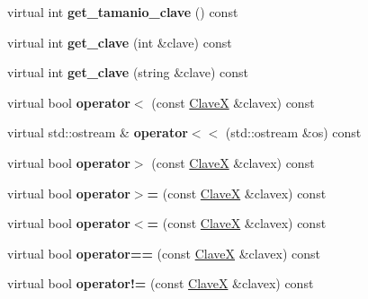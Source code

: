 \begin{DoxyCompactItemize}
\item 
\hypertarget{class_clave_x_a93b4ac4ef2ffc6097f29e64645c018c5}{virtual int {\bfseries get\-\_\-tamanio\-\_\-clave} () const }\label{class_clave_x_a93b4ac4ef2ffc6097f29e64645c018c5}

\item 
\hypertarget{class_clave_x_a253d37e0c4c94239fa0974912a369069}{virtual int {\bfseries get\-\_\-clave} (int \&clave) const }\label{class_clave_x_a253d37e0c4c94239fa0974912a369069}

\item 
\hypertarget{class_clave_x_a06133c17d00a6d21749a51374e06af24}{virtual int {\bfseries get\-\_\-clave} (string \&clave) const }\label{class_clave_x_a06133c17d00a6d21749a51374e06af24}

\item 
\hypertarget{class_clave_x_ae9f97104dadf4ce8df3473315e88e627}{virtual bool {\bfseries operator$<$} (const \hyperlink{class_clave_x}{\-Clave\-X} \&clavex) const }\label{class_clave_x_ae9f97104dadf4ce8df3473315e88e627}

\item 
\hypertarget{class_clave_x_a3ec83482d09657b57f06b3b3ddd81d1e}{virtual std\-::ostream \& {\bfseries operator$<$$<$} (std\-::ostream \&os) const }\label{class_clave_x_a3ec83482d09657b57f06b3b3ddd81d1e}

\item 
\hypertarget{class_clave_x_a01131bd8ce1bd7d5fd218e41ce5a299e}{virtual bool {\bfseries operator$>$} (const \hyperlink{class_clave_x}{\-Clave\-X} \&clavex) const }\label{class_clave_x_a01131bd8ce1bd7d5fd218e41ce5a299e}

\item 
\hypertarget{class_clave_x_a673ee633613ad3fa318a3de371779e9a}{virtual bool {\bfseries operator$>$=} (const \hyperlink{class_clave_x}{\-Clave\-X} \&clavex) const }\label{class_clave_x_a673ee633613ad3fa318a3de371779e9a}

\item 
\hypertarget{class_clave_x_ad7d03a9b8933f3316e417f1b3bf96add}{virtual bool {\bfseries operator$<$=} (const \hyperlink{class_clave_x}{\-Clave\-X} \&clavex) const }\label{class_clave_x_ad7d03a9b8933f3316e417f1b3bf96add}

\item 
\hypertarget{class_clave_x_ab6372c8625847a5290bad697379a4490}{virtual bool {\bfseries operator==} (const \hyperlink{class_clave_x}{\-Clave\-X} \&clavex) const }\label{class_clave_x_ab6372c8625847a5290bad697379a4490}

\item 
\hypertarget{class_clave_x_a1ae0d2c26df4f87bf4de1dbbb1cb03e3}{virtual bool {\bfseries operator!=} (const \hyperlink{class_clave_x}{\-Clave\-X} \&clavex) const }\label{class_clave_x_a1ae0d2c26df4f87bf4de1dbbb1cb03e3}

\end{DoxyCompactItemize}
